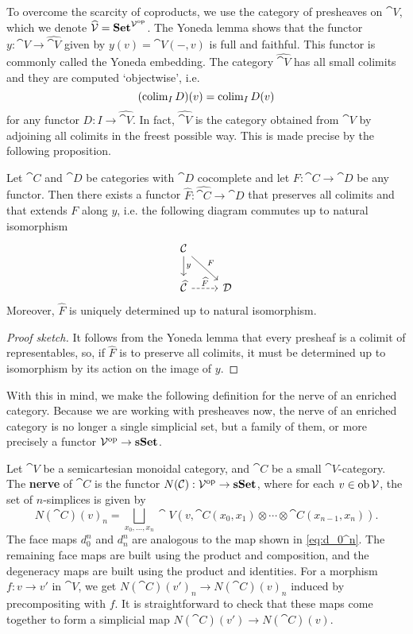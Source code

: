 To overcome the scarcity of coproducts, we use the category of presheaves on $\cat{V}$, which we denote $\widehat{\mathcal{V}} = \mathbf{Set}^{\mathcal{V}^{\mathrm{op}}}$. The Yoneda lemma shows that the functor $y : \cat{V} \to \widehat{\cat{V}}$ given by $y(v) = \cat{V}(-,v)$ is full and faithful. This functor is commonly called the Yoneda embedding. The category $\widehat{\cat{V}}$ has all small colimits and they are computed `objectwise', i.e.
\[\textstyle (\operatorname*{colim}_I D)(v) = \operatorname*{colim}_I D(v)\]
for any functor $D : I \to \widehat{\cat{V}}$. In fact, $\widehat{\cat{V}}$ is the category obtained from $\cat{V}$ by adjoining all colimits in the freest possible way. This is made precise by the following proposition.
\begin{proposition}
    Let $\cat{C}$ and $\cat{D}$ be categories with $\cat{D}$ cocomplete and let $F: \cat{C} \to \cat{D}$ be any functor. Then there exists a functor $\widehat{F} : \widehat{\cat{C}} \to \cat{D}$ that preserves all colimits and that extends $F$ along $y$, i.e. the following diagram commutes up to natural isomorphism
    \[\begin{tikzcd}
        \cat{C} \ar[d, "y"] \ar[dr, "F"]\\
        \widehat{\cat{C}} \ar[r, "\widehat{F}", dashed] & \cat{D}
    \end{tikzcd}\]
    Moreover, $\widehat{F}$ is uniquely determined up to natural isomorphism.
\end{proposition}
\begin{proof}[Proof sketch]
    It follows from the Yoneda lemma that every presheaf is a colimit of representables, so, if $\widehat{F}$ is to preserve all colimits, it must be determined up to isomorphism by its action on the image of $y$.
\end{proof}

With this in mind, we make the following definition for the nerve of an enriched category. Because we are working with presheaves now, the nerve of an enriched category is no longer a single simplicial set, but a family of them, or more precisely a functor $\mathcal{V}^{\mathrm{op}} \to \mathbf{sSet}$.
\begin{definition}
    Let $\cat{V}$ be a semicartesian monoidal category, and $\cat{C}$ be a small $\cat{V}$-category. The \textbf{nerve} of $\cat{C}$ is the functor $N(\mathcal{C}) : \mathcal{V}^{\mathrm{op}} \to \mathbf{sSet}$, where for each $v \in \operatorname{ob} \mathcal{V}$, the set of $n$-simplices is given by
    \[N(\cat{C})(v)_n = \bigsqcup_{x_0,\dots,x_n} \cat{V}(v, \cat{C}(x_0,x_1) \otimes \cdots \otimes \cat{C}(x_{n-1},x_n)).\]
    The face maps $d_0^n$ and $d_n^n$ are analogous to the map shown in \eqref{eq:d_0^n}. The remaining face maps are built using the product and composition, and the degeneracy maps are built using the product and identities. For a morphism $f: v \to v'$ in $\cat{V}$, we get $N(\cat{C})(v')_n \to N(\cat{C})(v)_n$ induced by precompositing with $f$. It is straightforward to check that these maps come together to form a simplicial map $N(\cat{C})(v') \to N(\cat{C})(v)$.
\end{definition}

